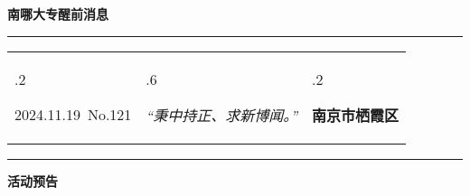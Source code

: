 \documentclass[letterpaper, 12pt]{article}
\begin{document}
\begin{center}
    \Huge\textbf{南哪大专醒前消息}
\end{center}
\vspace{4mm}
\hrule
\renewcommand\tabularxcolumn[1]{m{#1}}
\begin{tabularx}{\textwidth}{>{\hsize.2\hsize}X>{\hsize.6\hsize}X>{\hsize.2\hsize}X}
    \begin{flushleft}
        2024.11.19\, No.121
    \end{flushleft}
    &
    \begin{center}
        \textit{“秉中持正、求新博闻。”}
    \end{center}
    &
    \begin{flushright}
        \textbf{南京市栖霞区}
    \end{flushright}
\end{tabularx}
\vspace{-3.5mm}
\hrule
\vspace{4mm}
\centerline{\huge\textbf{活动预告}}
\end{document}
